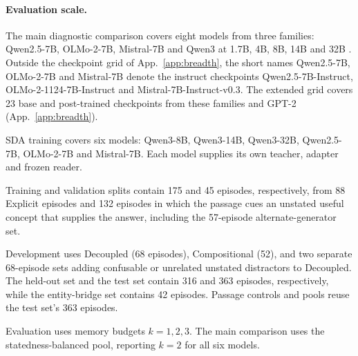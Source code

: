 \paragraph{Evaluation scale.}
\label{sec:breadth}
\label{sec:models}

The main diagnostic comparison covers eight models from three
families: Qwen2.5-7B, OLMo-2-7B, Mistral-7B and Qwen3 at 1.7B, 4B,
8B, 14B and 32B \citep{qwen2025,olmo2,jiang2023mistral,qwen3}.
Outside the checkpoint grid of App.~\ref{app:breadth}, the short
names Qwen2.5-7B, OLMo-2-7B and Mistral-7B denote the instruct
checkpoints Qwen2.5-7B-Instruct, OLMo-2-1124-7B-Instruct
and Mistral-7B-Instruct-v0.3. The extended grid covers 23 base and
post-trained checkpoints from these families and GPT-2
(App.~\ref{app:breadth}).

SDA training covers six models: Qwen3-8B,
Qwen3-14B, Qwen3-32B, Qwen2.5-7B, OLMo-2-7B and Mistral-7B.
Each model supplies its own teacher, adapter and frozen reader.

Training and validation splits contain 175 and 45 episodes,
respectively, from 88 Explicit episodes and 132 episodes in which the
passage cues an unstated useful concept that supplies the answer,
including the 57-episode alternate-generator set.

Development uses Decoupled (68 episodes), Compositional (52), and two
separate 68-episode sets adding confusable or unrelated unstated
distractors to Decoupled. The held-out set and the test set contain
316 and 363 episodes, respectively, while the entity-bridge set
contains 42 episodes. Passage controls and pools reuse the test set's
363 episodes.

Evaluation uses memory budgets $k=1,2,3$. The main comparison uses
the statedness-balanced pool, reporting $k=2$ for all six models.
